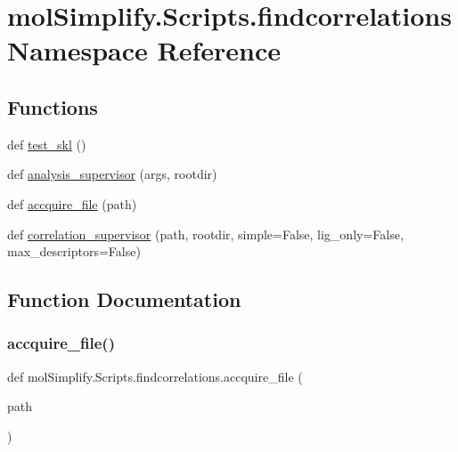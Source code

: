 \hypertarget{namespacemolSimplify_1_1Scripts_1_1findcorrelations}{}\section{mol\+Simplify.\+Scripts.\+findcorrelations Namespace Reference}
\label{namespacemolSimplify_1_1Scripts_1_1findcorrelations}
\subsection*{Functions}
\begin{DoxyCompactItemize}
\item 
def \hyperlink{namespacemolSimplify_1_1Scripts_1_1findcorrelations_a4cf422a7340295d19b9dce9b1cce1765}{test\+\_\+skl} ()
\item 
def \hyperlink{namespacemolSimplify_1_1Scripts_1_1findcorrelations_a6b8c2a6d6a9d3126b6db8dc8cac8cd62}{analysis\+\_\+supervisor} (args, rootdir)
\item 
def \hyperlink{namespacemolSimplify_1_1Scripts_1_1findcorrelations_a951936f3f4c5950a424b71e30700b4e9}{accquire\+\_\+file} (path)
\item 
def \hyperlink{namespacemolSimplify_1_1Scripts_1_1findcorrelations_a395f925222c2a91bf7e19df5cff8850e}{correlation\+\_\+supervisor} (path, rootdir, simple=False, lig\+\_\+only=False, max\+\_\+descriptors=False)
\end{DoxyCompactItemize}


\subsection{Function Documentation}
\mbox{\label{namespacemolSimplify_1_1Scripts_1_1findcorrelations_a951936f3f4c5950a424b71e30700b4e9}} 
\subsubsection{\texorpdfstring{accquire\+\_\+file()}{accquire\_file()}}
{\footnotesize\ttfamily def mol\+Simplify.\+Scripts.\+findcorrelations.\+accquire\+\_\+file (\begin{DoxyParamCaption}\item[{}]{path }\end{DoxyParamCaption})}

